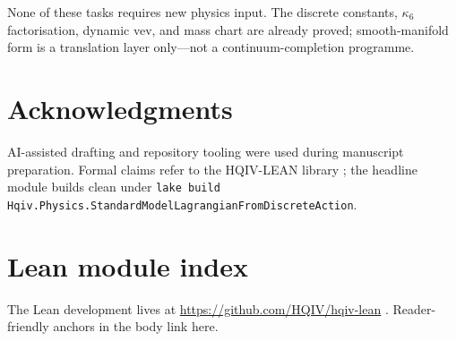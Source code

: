 \documentclass[11pt]{amsart}
\begin{document}
None of these tasks requires new physics input. The discrete constants,
$\kappa_6$ factorisation, dynamic vev, and mass chart are already proved;
smooth-manifold form is a translation layer only---not a continuum-completion
programme.

\section*{Acknowledgments}
AI-assisted drafting and repository tooling were used during manuscript
preparation. Formal claims refer to the HQIV-LEAN library \cite{hqiv-lean};
the headline module builds clean under \texttt{lake build}
\texttt{Hqiv.Physics.StandardModelLagrangianFromDiscreteAction}.

\appendix
\section{Lean module index}
\label{app:lean-index}

The Lean development lives at \url{https://github.com/HQIV/hqiv-lean}
\cite{hqiv-lean}. Reader-friendly anchors in the body link here.
\end{document}
